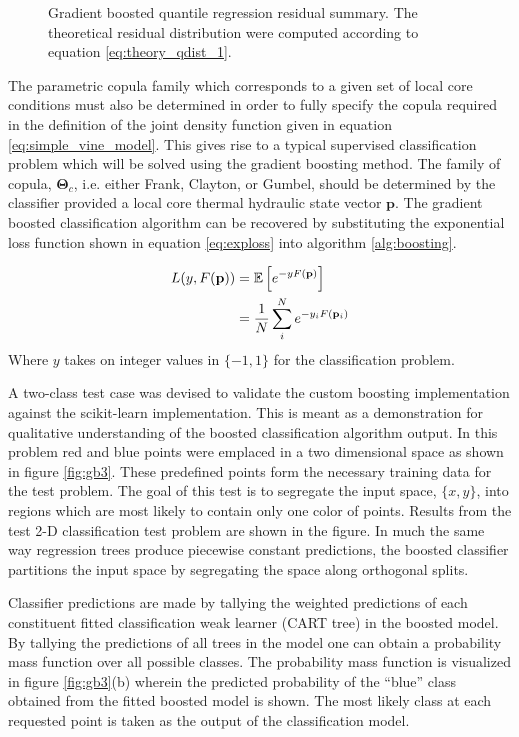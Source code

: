\begin{figure}[H]
    \caption[Gradient boosted quantile regression residual summary.]{Gradient boosted quantile regression residual summary.  The theoretical residual distribution were computed according to equation \ref{eq:theory_qdist_1}.} %
    \label{fig:gb2}%
\end{figure}

The parametric copula family which corresponds to a given set of local core conditions must also be determined in order to fully specify the copula required in the definition of the joint density function given in equation \ref{eq:simple_vine_model}.   This gives rise to a typical supervised classification problem which will be solved using the gradient boosting method.  The family of copula, $\mathbf \Theta_c$, i.e. either Frank, Clayton, or Gumbel, should be determined by the classifier provided a local core thermal hydraulic state vector $\mathbf p$.   The gradient boosted classification algorithm can be recovered by substituting the exponential loss function shown in equation \ref{eq:exploss} into algorithm \ref{alg:boosting}.   

\begin{align}
L(y, F(\mathbf p)) &= \operatorname*{\mathbb{E}} \left[ e^{-yF(\mathbf p)}\right] \nonumber \\
 &= \frac{1}{N}\sum_i^N e^{-y_iF(\mathbf p_i)}
\label{eq:exploss}
\end{align}
Where $y$ takes on integer values in $\{-1, 1\}$ for the classification problem.

A two-class test case was devised to validate the custom boosting implementation against the scikit-learn implementation.   This is meant as a demonstration for qualitative understanding of the boosted classification algorithm output.  In this problem red and blue points were emplaced in a two dimensional space as shown in figure \ref{fig:gb3}.  These predefined points form the necessary training data for the test problem. The goal of this test is to segregate the input space, $\{x, y\}$, into regions which are most likely to contain only one color of points. Results from the test 2-D classification test problem are shown in the figure.   In much the same way regression trees produce piecewise constant predictions, the boosted classifier partitions the input space by segregating the space along orthogonal splits.  

Classifier predictions are made by tallying the weighted predictions of each constituent fitted classification weak learner (CART tree) in the boosted model.  By tallying the predictions of all trees in the model one can obtain a probability mass function over all possible classes.  The probability mass function is visualized in figure \ref{fig:gb3}(b) wherein the predicted probability of the ``blue'' class obtained from the fitted boosted model is shown. The most likely class at each requested point is taken as the output of the classification model.

